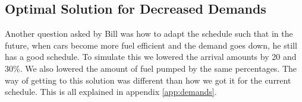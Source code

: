 \subsection{Optimal Solution for Decreased Demands}
Another question asked by Bill was how to adapt the schedule such that in the future, when cars become more fuel efficient and the demand goes down, he still has a good schedule. 
To simulate this we lowered the arrival amounts by 20 and 30\%. We also lowered the amount of fuel pumped by the same percentages. 
The way of getting to this solution was different than how we got it for the current schedule.
This is all explained in appendix \autoref{app:demands}.